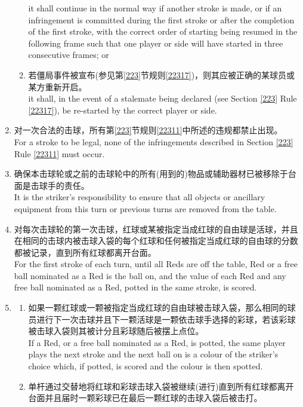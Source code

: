 \begin{enumerate}[label=(\alph*)]
\begin{enumerate}[label=(\roman*)]
        it shall continue in the normal way if another stroke is made, or if an infringement is committed during the first stroke or after the completion of the first stroke, with the correct order of starting being resumed in the following frame such that one player or side will have started in three consecutive frames; or
        \item \label{2233diii}若僵局事件被宣布(参见第\ref{223}节规则\ref{22317})，则其应被正确的某球员或某方重新开启。\\
        it shall, in the event of a stalemate being declared (see Section \ref{223} Rule \ref{22317}), be re-started by the correct player or side.
    \end{enumerate}
    \item 对一次合法的击球，所有第\ref{223}节规则\ref{22311}中所述的违规都禁止出现。\\
    For a stroke to be legal, none of the infringements described in Section \ref{223} Rule \ref{22311} must occur.
    \item 确保本击球轮或之前的击球轮中的所有(用到的)物品或辅助器材已被移除于台面是击球手的责任。\\
    It is the striker's responsibility to ensure that all objects or ancillary equipment from this turn or previous turns are removed from the table.
    \item 对每次击球轮的第一次击球，红球或某被指定当成红球的自由球是活球，并且在相同的击球内被击球入袋的每个红球和任何被指定当成红球的自由球的分数都被记录，直到所有红球都离开台面。\\
    For the first stroke of each turn, until all Reds are off the table, Red or a free ball nominated as a Red is the ball on, and the value of each Red and any free ball nominated as a Red, potted in the same stroke, is scored.
    \item \label{2233h}
    \begin{enumerate}[label=(\roman*)]
        \item 如果一颗红球或一颗被指定当成红球的自由球被击球入袋，那么相同的球员进行下一次击球并且下一颗活球是一颗依击球手选择的彩球，若该彩球被击球入袋则其被计分且彩球随后被摆上点位。\\
        If a Red, or a free ball nominated as a Red, is potted, the same player plays the next stroke and the next ball on is a colour of the striker's choice which, if potted, is scored and the colour is then spotted.
        \item 单杆通过交替地将红球和彩球击球入袋被继续(进行)直到所有红球都离开台面并且届时一颗彩球已在最后一颗红球的击球入袋后被击打。\\

\end{enumerate}
\end{enumerate}
